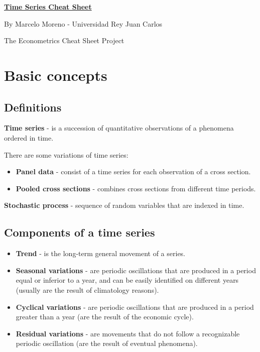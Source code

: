 \documentclass[10pt, a4paper, landscape]{article}
\begin{document}
	\begin{multicols}{3}
		\begin{center}
			\textbf{\LARGE \href{https://github.com/marcelomijas/econometrics-cheatsheet}{Time Series Cheat Sheet}}
			
			{\footnotesize By Marcelo Moreno - Universidad Rey Juan Carlos}
			
			{\footnotesize The Econometrics Cheat Sheet Project}
		\end{center}
		
		\section*{Basic concepts}
		
		\subsection*{Definitions}
		
		\textbf{Time series} - is a succession of quantitative observations of a phenomena ordered in time.
		
		There are some variations of time series:
		
		\begin{itemize}[leftmargin=*]
			\item \textbf{Panel data} - consist of a time series for each observation of a cross section.
			\item \textbf{Pooled cross sections} - combines cross sections from different time periods.
		\end{itemize}
		
		\textbf{Stochastic process} - sequence of random variables that are indexed in time.
		
		\subsection*{Components of a time series}
		
		\begin{itemize}[leftmargin=*]
			\item \textbf{Trend} - is the long-term general movement of a series.
			\item \textbf{Seasonal variations} - are periodic oscillations that are produced in a period equal or inferior to a year, and can be easily identified on different years (usually are the result of climatology reasons).
			\item \textbf{Cyclical variations} - are periodic oscillations that are produced in a period greater than a year (are the result of the economic cycle).
			\item \textbf{Residual variations} - are movements that do not follow a recognizable periodic oscillation (are the result of eventual phenomena).
		\end{itemize}
		

\end{multicols}
\end{document}

